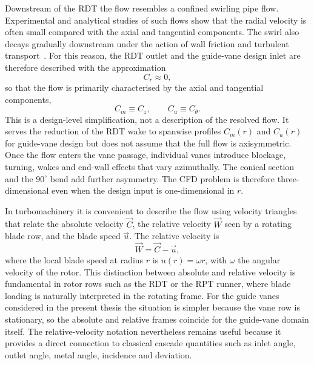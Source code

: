 Downstream of the RDT the flow resembles a confined swirling pipe flow. Experimental and analytical studies of such flows show that the radial velocity is often small compared with the axial and tangential components. The swirl also decays gradually downstream under the action of wall friction and turbulent transport~\cite{Kitoh1991}. For this reason, the RDT outlet and the guide-vane design inlet are therefore described with the approximation
\begin{equation}
C_r \approx 0,
\label{eq:Cr_zero}
\end{equation}
so that the flow is primarily characterised by the axial and tangential components,
\begin{equation}
C_m \equiv C_z, \qquad C_u \equiv C_\theta.
\label{eq:Cm_Cu_def}
\end{equation}
This is a design-level simplification, not a description of the resolved flow. It serves the reduction of the RDT wake to spanwise profiles $C_m(r)$ and $C_u(r)$ for guide-vane design but does not assume that the full flow is axisymmetric. Once the flow enters the vane passage, individual vanes introduce blockage, turning, wakes and end-wall effects that vary azimuthally. The conical section and the $90^\circ$ bend add further asymmetry. The CFD problem is therefore three-dimensional even when the design input is one-dimensional in $r$.

In turbomachinery it is convenient to describe the flow using velocity triangles that relate the absolute velocity $\vec{C}$, the relative velocity $\vec{W}$ seen by a rotating blade row, and the blade speed $\vec{u}$. The relative velocity is
\begin{equation}
\vec{W} = \vec{C} - \vec{u},
\label{eq:relative_velocity}
\end{equation}
where the local blade speed at radius $r$ is $u(r) = \omega r$, with $\omega$ the angular velocity of the rotor. This distinction between absolute and relative velocity is fundamental in rotor rows such as the RDT or the RPT runner, where blade loading is naturally interpreted in the rotating frame. For the guide vanes considered in the present thesis the situation is simpler because the vane row is stationary, so the absolute and relative frames coincide for the guide-vane domain itself. The relative-velocity notation nevertheless remains useful because it provides a direct connection to classical cascade quantities such as inlet angle, outlet angle, metal angle, incidence and deviation.

